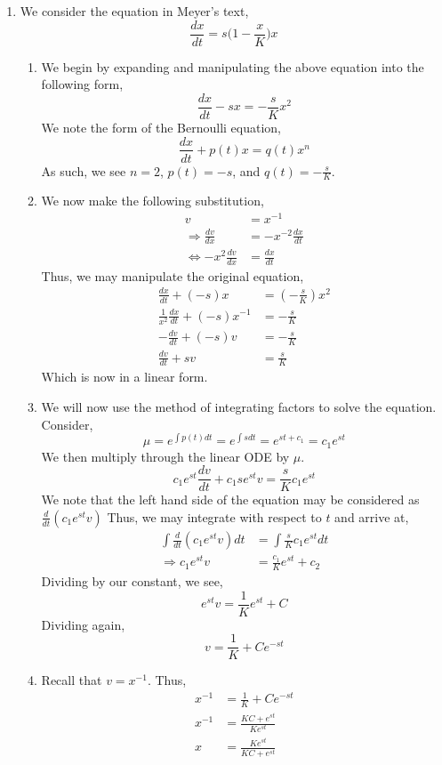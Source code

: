 \documentclass[letterpaper,10pt]{article}
\begin{document}
\begin{enumerate}
\item We consider the equation in Meyer's text,
\[\frac{dx}{dt}=s\bigg(1-\frac{x}{K}\bigg)x\]
\begin{enumerate}
\item We begin by expanding and manipulating the above equation into the following form,
\[\frac{dx}{dt}-sx=-\frac{s}{K}x^2\]
We note the form of the Bernoulli equation,
\[\frac{dx}{dt}+p(t)x=q(t)x^n\]
As such, we see $n=2$, $p(t)=-s$, and $q(t)=-\frac{s}{K}$.
\item We now make the following substitution,
\begin{align*}
v &= x^{-1}\\
\Rightarrow \frac{dv}{dx} &= -x^{-2}\frac{dx}{dt}\\
\Leftrightarrow -x^2\frac{dv}{dx} &= \frac{dx}{dt}
\end{align*}
Thus, we may manipulate the original equation,
\begin{align*}
\frac{dx}{dt}+(-s)x &= (-\frac{s}{K})x^2\\
\frac{1}{x^2}\frac{dx}{dt}+(-s)x^{-1} &= -\frac{s}{K}\\
-\frac{dv}{dt}+(-s)v &= -\frac{s}{K}\\
\frac{dv}{dt}+sv &= \frac{s}{K}
\end{align*}
Which is now in a linear form.
\item We will now use the method of integrating factors to solve the equation. Consider,
\[\mu=e^{\int p(t)dt}=e^{\int sdt}=e^{st+c_1}=c_1e^{st}\]
We then multiply through the linear ODE by $\mu$.
\[c_1e^{st}\frac{dv}{dt}+c_1se^{st}v=\frac{s}{K}c_1e^{st}\]
We note that the left hand side of the equation may be considered as $\frac{d}{dt}(c_1e^{st}v)$ Thus, we may integrate with respect to $t$ and arrive at,
\begin{align*}
\int \frac{d}{dt}(c_1e^{st}v)dt &= \int \frac{s}{K}c_1e^{st} dt\\
\Rightarrow c_1e^{st}v &= \frac{c_1}{K}e^{st}+c_2
\end{align*}
Dividing by our constant, we see,
\[e^{st}v=\frac{1}{K}e^{st}+C\]
Dividing again,
\[v=\frac{1}{K}+Ce^{-st}\]
\item Recall that $v=x^{-1}$. Thus,
\begin{align*}
x^{-1} &= \frac{1}{K}+Ce^{-st}\\
x^{-1} &= \frac{KC+e^{st}}{Ke^{st}}\\
x &= \frac{Ke^{st}}{KC+e^{st}}
\end{align*}

\end{enumerate}
\end{enumerate}
\end{document}

